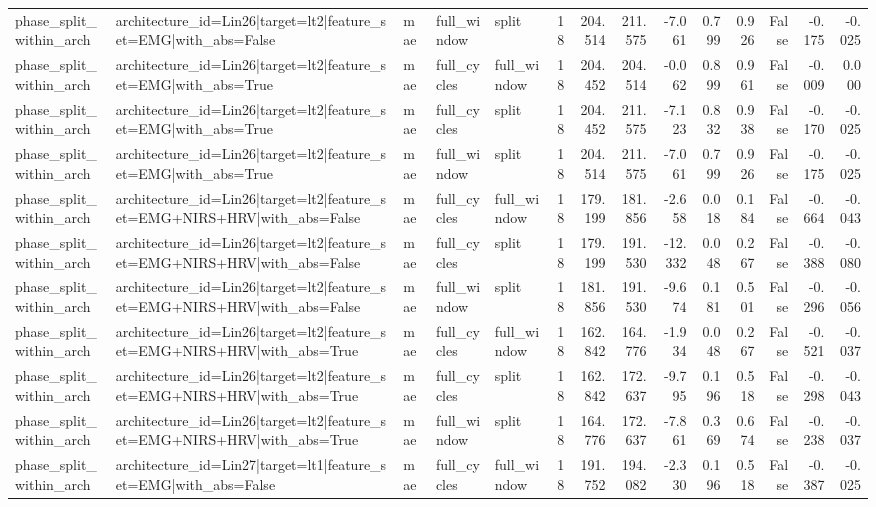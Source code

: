 \begin{table}
\begin{tabular}{lllllrrrrrrrrr}
phase_split_within_arch & architecture_id=Lin26|target=lt2|feature_set=EMG|with_abs=False & mae & full_window & split & 18 & 204.514 & 211.575 & -7.061 & 0.799 & 0.926 & False & -0.175 & -0.025 \\
phase_split_within_arch & architecture_id=Lin26|target=lt2|feature_set=EMG|with_abs=True & mae & full_cycles & full_window & 18 & 204.452 & 204.514 & -0.062 & 0.899 & 0.961 & False & -0.009 & 0.000 \\
phase_split_within_arch & architecture_id=Lin26|target=lt2|feature_set=EMG|with_abs=True & mae & full_cycles & split & 18 & 204.452 & 211.575 & -7.123 & 0.832 & 0.938 & False & -0.170 & -0.025 \\
phase_split_within_arch & architecture_id=Lin26|target=lt2|feature_set=EMG|with_abs=True & mae & full_window & split & 18 & 204.514 & 211.575 & -7.061 & 0.799 & 0.926 & False & -0.175 & -0.025 \\
phase_split_within_arch & architecture_id=Lin26|target=lt2|feature_set=EMG+NIRS+HRV|with_abs=False & mae & full_cycles & full_window & 18 & 179.199 & 181.856 & -2.658 & 0.018 & 0.184 & False & -0.664 & -0.043 \\
phase_split_within_arch & architecture_id=Lin26|target=lt2|feature_set=EMG+NIRS+HRV|with_abs=False & mae & full_cycles & split & 18 & 179.199 & 191.530 & -12.332 & 0.048 & 0.267 & False & -0.388 & -0.080 \\
phase_split_within_arch & architecture_id=Lin26|target=lt2|feature_set=EMG+NIRS+HRV|with_abs=False & mae & full_window & split & 18 & 181.856 & 191.530 & -9.674 & 0.181 & 0.501 & False & -0.296 & -0.056 \\
phase_split_within_arch & architecture_id=Lin26|target=lt2|feature_set=EMG+NIRS+HRV|with_abs=True & mae & full_cycles & full_window & 18 & 162.842 & 164.776 & -1.934 & 0.048 & 0.267 & False & -0.521 & -0.037 \\
phase_split_within_arch & architecture_id=Lin26|target=lt2|feature_set=EMG+NIRS+HRV|with_abs=True & mae & full_cycles & split & 18 & 162.842 & 172.637 & -9.795 & 0.196 & 0.518 & False & -0.298 & -0.043 \\
phase_split_within_arch & architecture_id=Lin26|target=lt2|feature_set=EMG+NIRS+HRV|with_abs=True & mae & full_window & split & 18 & 164.776 & 172.637 & -7.861 & 0.369 & 0.674 & False & -0.238 & -0.037 \\
phase_split_within_arch & architecture_id=Lin27|target=lt1|feature_set=EMG|with_abs=False & mae & full_cycles & full_window & 18 & 191.752 & 194.082 & -2.330 & 0.196 & 0.518 & False & -0.387 & -0.025 \\

\end{tabular}
\end{table}
